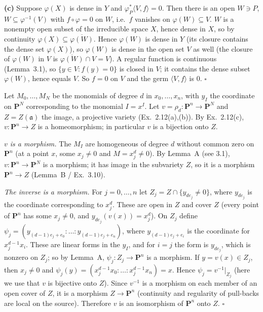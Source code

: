 \documentclass[11pt]{article}
\begin{document}
\textbf{(c)} Suppose $\varphi(X)$ is dense in $Y$ and $\varphi^*_P\langle V,f\rangle=0$. Then there is an open $W\ni P$, $W\subseteq\varphi^{-1}(V)$ with $f\circ\varphi=0$ on $W$, i.e.\ $f$ vanishes on $\varphi(W)\subseteq V$. $W$ is a nonempty open subset of the irreducible space $X$, hence dense in $X$, so by continuity $\varphi(X)\subseteq\overline{\varphi(W)}$. Hence $\varphi(W)$ is dense in $Y$ (its closure contains the dense set $\varphi(X)$), so $\varphi(W)$ is dense in the open set $V$ as well (the closure of $\varphi(W)$ in $V$ is $\overline{\varphi(W)}\cap V=V$). A regular function is continuous (Lemma~3.1), so $\{y\in V:f(y)=0\}$ is closed in $V$; it contains the dense subset $\varphi(W)$, hence equals $V$. So $f=0$ on $V$ and the germ $\langle V,f\rangle$ is $0$. \hfill$\square$


\pf
Let $M_0,\dots,M_N$ be the monomials of degree $d$ in $x_0,\dots,x_n$, with $y_I$ the coordinate on $\mathbf P^N$ corresponding to the monomial $I=x^I$. Let $v=\rho_d:\mathbf P^n\to\mathbf P^N$ and $Z=Z(\mathfrak a)$ the image, a projective variety (Ex.~2.12(a),(b)). By Ex.~2.12(c), $v:\mathbf P^n\to Z$ is a homeomorphism; in particular $v$ is a bijection onto $Z$.

\emph{$v$ is a morphism.} The $M_I$ are homogeneous of degree $d$ without common zero on $\mathbf P^n$ (at a point $x$, some $x_j\ne0$ and $M=x_j^d\ne0$). By Lemma~A (see 3.1), $v:\mathbf P^n\to\mathbf P^N$ is a morphism; it has image in the subvariety $Z$, so it is a morphism $\mathbf P^n\to Z$ (Lemma~B / Ex.~3.10).

\emph{The inverse is a morphism.} For $j=0,\dots,n$ let $Z_j=Z\cap\{y_{de_j}\ne0\}$, where $y_{de_j}$ is the coordinate corresponding to $x_j^d$. These are open in $Z$ and cover $Z$ (every point of $\mathbf P^n$ has some $x_j\ne0$, and $y_{de_j}(v(x))=x_j^d$). On $Z_j$ define $\psi_j=(y_{(d-1)e_j+e_0}:\dots:y_{(d-1)e_j+e_n})$, where $y_{(d-1)e_j+e_i}$ is the coordinate for $x_j^{d-1}x_i$. These are linear forms in the $y_I$, and for $i=j$ the form is $y_{de_j}$, which is nonzero on $Z_j$; so by Lemma~A, $\psi_j:Z_j\to\mathbf P^n$ is a morphism. If $y=v(x)\in Z_j$, then $x_j\ne0$ and $\psi_j(y)=(x_j^{d-1}x_0:\dots:x_j^{d-1}x_n)=x$. Hence $\psi_j=v^{-1}|_{Z_j}$ (here we use that $v$ is bijective onto $Z$). Since $v^{-1}$ is a morphism on each member of an open cover of $Z$, it is a morphism $Z\to\mathbf P^n$ (continuity and regularity of pull-backs are local on the source). Therefore $v$ is an isomorphism of $\mathbf P^n$ onto $Z$. \hfill$\square$
\end{document}
